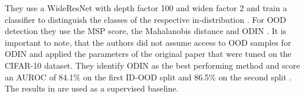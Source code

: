 They use a WideResNet \citep{Zagoruyko2016} with depth factor 100 and widen factor 2 and train a classifier to distinguish the classes of the respective in-distribution \citep{Berger2021}.
For OOD detection they use the MSP score, the Mahalanobis distance and ODIN \citep{Berger2021}.
It is important to note, that the authors did not assume access to OOD samples for ODIN and applied the parameters of the original paper \citep{Liang2018} that were tuned on the CIFAR-10 \citep{Krizhevsky2009b} dataset.
They identify ODIN as the best performing method and score an AUROC of 84.1\% on the first ID-OOD split and 86.5\% on the second split \citep{Berger2021}.
The results in \citep{Berger2021} are used as a supervised baseline.
\par
\label{section: SSL}
